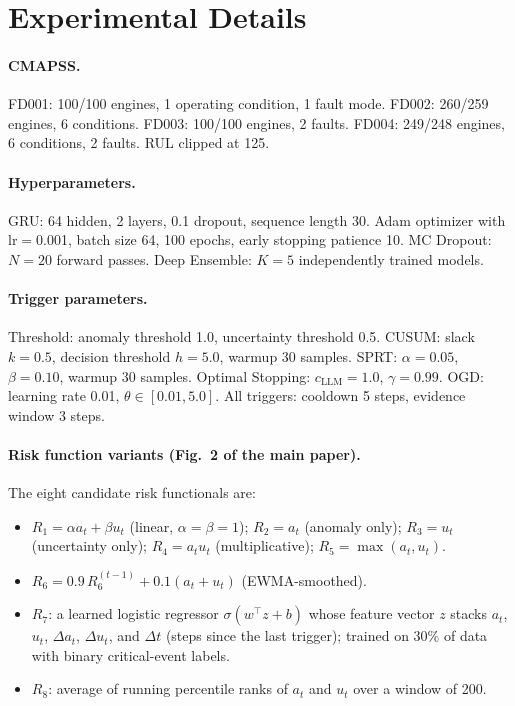 \section{Experimental Details}
\label{app:details}

\paragraph{CMAPSS.}
FD001: 100/100 engines, 1 operating condition, 1 fault mode.
FD002: 260/259 engines, 6 conditions.
FD003: 100/100 engines, 2 faults.
FD004: 249/248 engines, 6 conditions, 2 faults.
RUL clipped at 125.

\paragraph{Hyperparameters.}
GRU: 64 hidden, 2 layers, 0.1 dropout, sequence length 30.
Adam optimizer with lr$=$0.001, batch size 64, 100 epochs, early stopping patience 10.
MC Dropout: $N=20$ forward passes.
Deep Ensemble: $K=5$ independently trained models.

\paragraph{Trigger parameters.}
Threshold: anomaly threshold 1.0, uncertainty threshold 0.5.
CUSUM: slack $k=0.5$, decision threshold $h=5.0$, warmup 30 samples.
SPRT: $\alpha=0.05$, $\beta=0.10$, warmup 30 samples.
Optimal Stopping: $c_{\text{LLM}}=1.0$, $\gamma=0.99$.
OGD: learning rate 0.01, $\theta\in[0.01, 5.0]$.
All triggers: cooldown 5 steps, evidence window 3 steps.

\paragraph{Risk function variants (Fig.~2 of the main paper).}
The eight candidate risk functionals are:
\begin{itemize}
\item $R_1{=}\alpha a_t + \beta u_t$ (linear, $\alpha{=}\beta{=}1$);
$R_2{=}a_t$ (anomaly only); $R_3{=}u_t$ (uncertainty only);
$R_4{=}a_t u_t$ (multiplicative); $R_5{=}\max(a_t,u_t)$.
\item $R_6{=}0.9\,R_6^{(t-1)} + 0.1(a_t+u_t)$ (EWMA-smoothed).
\item $R_7$: a learned logistic regressor $\sigma(w^\top z{+}b)$ whose
feature vector $z$ stacks $a_t$, $u_t$, $\Delta a_t$, $\Delta u_t$, and
$\Delta t$ (steps since the last trigger); trained on 30\% of data with
binary critical-event labels.
\item $R_8$: average of running percentile ranks of $a_t$ and $u_t$
over a window of 200.
\end{itemize}

